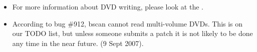 \begin{itemize}
\item For more information about DVD writing, please look at the
.

\item According to bug \#912, bscan cannot read multi-volume DVDs.  This is
on our TODO list, but unless someone submits a patch it is not likely to be
done any time in the near future. (9 Sept 2007).

\end{itemize}
